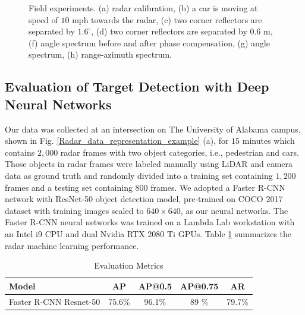 \documentclass[conference]{IEEEtran}
\begin{document}
\begin{figure}
\caption{\label{fig_experiment_cali_car} Field experiments. (a) radar calibration, (b) a car is moving at speed of $10$ mph towards the radar, (c) two corner reflectors are separated by $1.6^\circ$, (d) two corner reflectors are separated by $0.6$ m, (f) angle spectrum before and after phase compensation, (g) angle spectrum, (h) range-azimuth spectrum.}
\vspace{-5mm}
\end{figure}

\subsection{Evaluation of Target Detection with Deep Neural Networks}
Our data was collected at an intersection on The University of Alabama campus, shown in Fig. \ref{Radar_data_representation_example} (a), for $15$ minutes which contains $2,000$ radar frames with two object categories, i.e., pedestrian and cars. Those objects in radar frames were labeled manually using LiDAR and camera data as ground truth and randomly divided into a  training set containing $1,200$ frames and a  testing set containing $800$ frames. We adopted a Faster R-CNN network \cite{ren2016faster} with ResNet-50 object detection model, pre-trained on COCO 2017 dataset \cite{lin2014microsoft}  with training images scaled to $640\times640$, as our neural networks. The Faster R-CNN neural networks was trained on a Lambda Lab workstation with an Intel i9 CPU and dual Nvidia RTX 2080 Ti GPUs. Table \ref{table_radar_ML} summarizes the radar machine learning performance. 

\begin{table}[h]
\centering
\begin{tabular}{|l| c |c| c| c|} 
 \hline
 {\bf Model} &  {\bf AP} & {\bf AP@0.5} & {\bf AP@0.75} & {\bf AR}\\%
 \hline
 Faster R-CNN Resnet-50  & 75.6\% & 96.1\% & 89 \%& 79.7\%\\ 
 \hline
\end{tabular}
\vspace{2mm}
\caption{Evaluation Metrics}
\label{table_radar_ML}
\vspace{-5mm}
\end{table}
\end{document}
